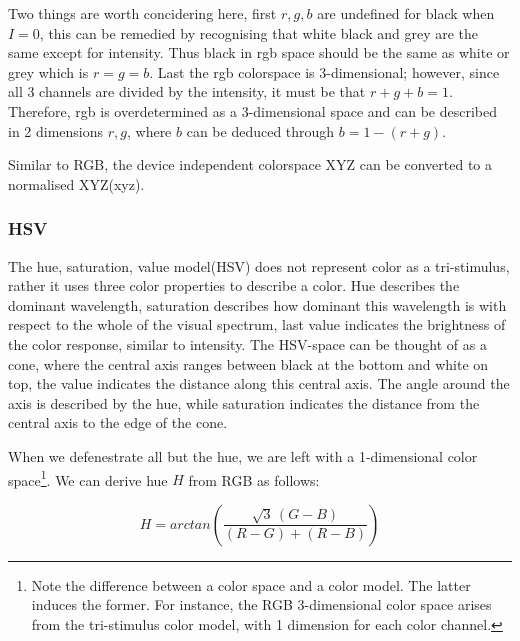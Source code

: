 \documentclass[a4paper,11pt]{article}
\begin{document}
Two things are worth concidering here, first $r,g,b$ are undefined for black when $I=0$, this can be remedied by recognising that white black and grey are the same except for intensity. Thus black in rgb space should be the same as white or grey which is $r=g=b$. Last the rgb colorspace is 3-dimensional; however, since all 3 channels are divided by the intensity, it must be that $r+g+b=1$. Therefore, rgb is overdetermined as a 3-dimensional space and can be described in 2 dimensions $r,g$, where $b$ can be deduced through $b=1-(r+g)$.



Similar to RGB, the device independent colorspace XYZ can be converted to a normalised XYZ(xyz).		

		

\subsubsection{HSV}

The hue, saturation, value model(HSV) does not represent color as a tri-stimulus, rather it uses three color properties to describe a color. Hue describes the dominant wavelength, saturation describes how dominant this wavelength is with respect to the whole of the visual spectrum, last value indicates the brightness of the color response, similar to intensity. The HSV-space can be thought of as a cone, where the central axis ranges between black at the bottom and white on top, the value indicates the distance along this central axis. The angle around the axis is described by the hue, while saturation indicates the distance from the central axis to the edge of the cone. 



When we defenestrate all but the hue, we are left with a 1-dimensional color space\footnote{Note the difference between a color space and a color model. The latter induces the former. For instance, the RGB 3-dimensional color space arises from the tri-stimulus color model, with 1 dimension for each color channel.}.  We can derive hue $H$ from RGB as follows:



\begin{equation}

\label{eq:hue}

H = arctan\left(\frac{\sqrt{3}\,(G-B)}{(R-G)+(R-B)}\right)

\end{equation} 
\end{document}
